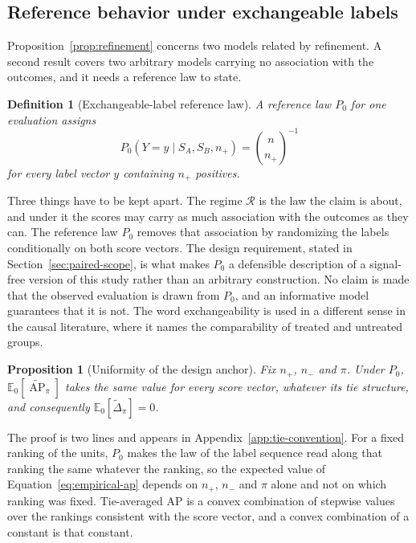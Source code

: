 \documentclass[11pt]{article}
\newcommand{\AP}{\operatorname{AP}}
\newcommand{\Regime}{\mathcal{R}}
\newcommand{\E}{\mathbb{E}}
\newcommand{\APta}{\widetilde{\AP}}
\newcommand{\Dta}{\widetilde{\Delta}}
\newtheorem{definition}{Definition}
\newtheorem{proposition}{Proposition}
\theoremstyle{remark}
\begin{document}
\subsection{Reference behavior under exchangeable labels}
\label{sec:reference-law}

Proposition~\ref{prop:refinement} concerns two models related by refinement. A second result covers two arbitrary models carrying no association with the outcomes, and it needs a reference law to state.

\begin{definition}[Exchangeable-label reference law]
\label{def:label-condition}
A reference law $P_0$ for one evaluation assigns
\[
P_0\left(Y=y\mid S_A,S_B,n_+\right)
=
\binom{n}{n_+}^{-1}
\]
for every label vector $y$ containing $n_+$ positives.
\end{definition}

Three things have to be kept apart. The regime $\Regime$ is the law the claim is about, and under it the scores may carry as much association with the outcomes as they can. The reference law $P_0$ removes that association by randomizing the labels conditionally on both score vectors. The design requirement, stated in Section~\ref{sec:paired-scope}, is what makes $P_0$ a defensible description of a signal-free version of this study rather than an arbitrary construction. No claim is made that the observed evaluation is drawn from $P_0$, and an informative model guarantees that it is not. The word exchangeability is used in a different sense in the causal literature, where it names the comparability of treated and untreated groups.

\begin{proposition}[Uniformity of the design anchor]
\label{prop:uniformity}
Fix $n_+$, $n_-$ and $\pi$. Under $P_0$, $\E_0[\APta_\pi]$ takes the same value for every score vector, whatever its tie structure, and consequently $\E_0[\Dta_\pi]=0$.
\end{proposition}

The proof is two lines and appears in Appendix~\ref{app:tie-convention}. For a fixed ranking of the units, $P_0$ makes the law of the label sequence read along that ranking the same whatever the ranking, so the expected value of Equation~\eqref{eq:empirical-ap} depends on $n_+$, $n_-$ and $\pi$ alone and not on which ranking was fixed. Tie-averaged AP is a convex combination of stepwise values over the rankings consistent with the score vector, and a convex combination of a constant is that constant.
\end{document}

